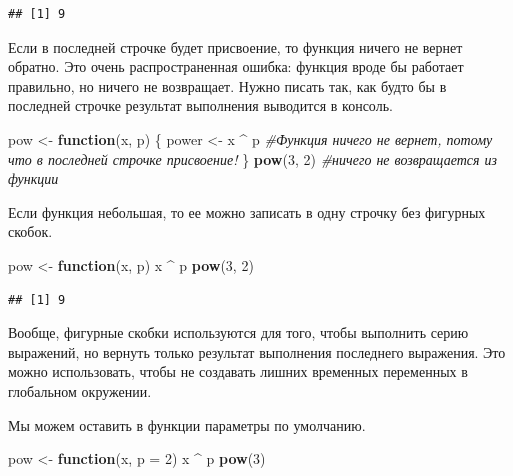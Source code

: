 \documentclass[
]{book}
\newenvironment{Shaded}{\begin{snugshade}}{\end{snugshade}}
\newcommand{\CommentTok}[1]{\textcolor[rgb]{0.56,0.35,0.01}{\textit{#1}}}
\newcommand{\ControlFlowTok}[1]{\textcolor[rgb]{0.13,0.29,0.53}{\textbf{#1}}}
\newcommand{\DataTypeTok}[1]{\textcolor[rgb]{0.13,0.29,0.53}{#1}}
\newcommand{\DecValTok}[1]{\textcolor[rgb]{0.00,0.00,0.81}{#1}}
\newcommand{\KeywordTok}[1]{\textcolor[rgb]{0.13,0.29,0.53}{\textbf{#1}}}
\newcommand{\NormalTok}[1]{#1}
\newcommand{\OperatorTok}[1]{\textcolor[rgb]{0.81,0.36,0.00}{\textbf{#1}}}
\newcommand{\StringTok}[1]{\textcolor[rgb]{0.31,0.60,0.02}{#1}}
\begin{document}
\begin{verbatim}
## [1] 9
\end{verbatim}

Если в последней строчке будет присвоение, то функция ничего не вернет обратно. Это очень распространенная ошибка: функция вроде бы работает правильно, но ничего не возвращает. Нужно писать так, как будто бы в последней строчке результат выполнения выводится в консоль.

\begin{Shaded}
\begin{Highlighting}[]
\NormalTok{pow <-}\StringTok{ }\ControlFlowTok{function}\NormalTok{(x, p) \{}
\NormalTok{  power <-}\StringTok{ }\NormalTok{x }\OperatorTok{^}\StringTok{ }\NormalTok{p }\CommentTok{#Функция ничего не вернет, потому что в последней строчке присвоение!}
\NormalTok{\}}
\KeywordTok{pow}\NormalTok{(}\DecValTok{3}\NormalTok{, }\DecValTok{2}\NormalTok{) }\CommentTok{#ничего не возвращается из функции}
\end{Highlighting}
\end{Shaded}

Если функция небольшая, то ее можно записать в одну строчку без фигурных скобок.

\begin{Shaded}
\begin{Highlighting}[]
\NormalTok{pow <-}\StringTok{ }\ControlFlowTok{function}\NormalTok{(x, p) x }\OperatorTok{^}\StringTok{ }\NormalTok{p}
\KeywordTok{pow}\NormalTok{(}\DecValTok{3}\NormalTok{, }\DecValTok{2}\NormalTok{) }
\end{Highlighting}
\end{Shaded}

\begin{verbatim}
## [1] 9
\end{verbatim}

Вообще, фигурные скобки используются для того, чтобы выполнить серию выражений, но вернуть только результат выполнения последнего выражения. Это можно использовать, чтобы не создавать лишних временных переменных в глобальном окружении.

Мы можем оставить в функции параметры по умолчанию.

\begin{Shaded}
\begin{Highlighting}[]
\NormalTok{pow <-}\StringTok{ }\ControlFlowTok{function}\NormalTok{(x, }\DataTypeTok{p =} \DecValTok{2}\NormalTok{) x }\OperatorTok{^}\StringTok{ }\NormalTok{p}
\KeywordTok{pow}\NormalTok{(}\DecValTok{3}\NormalTok{) }
\end{Highlighting}
\end{Shaded}
\end{document}
